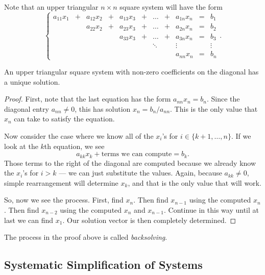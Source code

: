 \documentclass[elementsmain.tex]{subfiles}
\begin{document}
Note that an upper triangular $n\times n$ square system will have the form
\begin{equation}\label{eq:08-uts-sys}
\left\{
\begin{array}{ccccccccccc}
a_{11} x_1 & + & a_{12} x_2 & + & a_{13} x_3 & + & \dots & + & a_{1n} x_n & = & b_1 \\
& & a_{22} x_2 & + & a_{23} x_3 & + &\dots & + & a_{2n} x_n & = & b_2 \\
& & &  & a_{33} x_3 & + & \dots & + & a_{3n} x_n & = & b_3 \\
& & &  && & \ddots &  & \vdots     &  & \vdots \\ 
& & &  &&&  &  & a_{nn} x_n & = & b_n
\end{array}\right..
\end{equation}

\begin{theorem}\label{thm:09-backsolving}
An upper triangular square system with non-zero coefficients on the diagonal has a unique solution.
\end{theorem}

\begin{proof} First, note that the last equation has the form $a_{nn} x_n = b_n$. Since the diagonal entry $a_{nn} \neq 0$, this has solution $x_n = b_n/a_{nn}$. This is the only value that $x_n$ can take to satisfy the equation.

Now consider the case where we know all of the $x_i$'s for $i \in \{k+1, \dots, n\}$. If we look at the $k$th equation, we see
\[
a_{kk} x_k + \text{terms we can compute} = b_k.
\]
Those terms to the right of the diagonal are computed because we already know the $x_i$'s for $i>k$ --- we can just substitute the values. Again, because $a_{kk}\neq 0$, simple rearrangement will determine $x_k$, and that is the only value that will work.

So, now we see the process. First, find $x_n$. Then find $x_{n-1}$ using the computed $x_{n}$. Then find $x_{n-2}$ using the computed $x_n$ and $x_{n-1}$. Continue in this way until at last we can find $x_1$. Our solution vector is then completely determined.
\end{proof}

\begin{definition}[Backsolving]
The process in the proof above is called \emph{backsolving}.
\end{definition}


\subsection*{Systematic Simplification of Systems}
\end{document}
